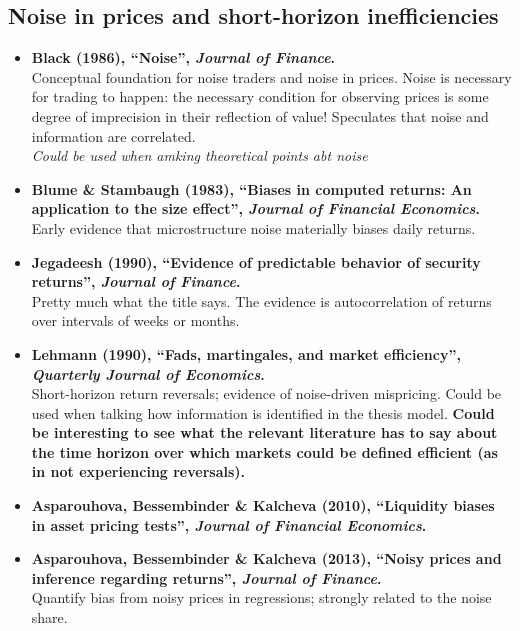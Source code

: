 \documentclass[11pt,a4paper]{article}
\begin{document}
\subsection{Noise in prices and short-horizon inefficiencies}

\begin{itemize}
  \item \textbf{Black (1986), ``Noise'', \emph{Journal of Finance}.}\\
  Conceptual foundation for noise traders and noise in prices. Noise is necessary for trading to happen: the necessary condition for observing prices is some degree of imprecision in their reflection of value!
  Speculates that noise and information are correlated.\\
  \textit{Could be used when amking theoretical points abt noise}

  \item \textbf{Blume \& Stambaugh (1983), ``Biases in computed returns: An application to the size effect'', \emph{Journal of Financial Economics}.}\\
  Early evidence that microstructure noise materially biases daily returns.

  \item \textbf{Jegadeesh (1990), ``Evidence of predictable behavior of security returns'', \emph{Journal of Finance}.}\\
  Pretty much what the title says. The evidence is autocorrelation of returns over intervals of weeks or months.
  
  \item \textbf{Lehmann (1990), ``Fads, martingales, and market efficiency'', \emph{Quarterly Journal of Economics}.}\\
  Short-horizon return reversals; evidence of noise-driven mispricing. Could be used when talking how information is identified in the thesis model.
  \textbf{Could be interesting to see what the relevant literature has to say about the time horizon over which markets could be defined efficient (as in not experiencing reversals).}

  \item \textbf{Asparouhova, Bessembinder \& Kalcheva (2010), ``Liquidity biases in asset pricing tests'', \emph{Journal of Financial Economics}.}
  \item \textbf{Asparouhova, Bessembinder \& Kalcheva (2013), ``Noisy prices and inference regarding returns'', \emph{Journal of Finance}.}\\
  Quantify bias from noisy prices in regressions; strongly related to the noise share.


\end{itemize}
\end{document}
